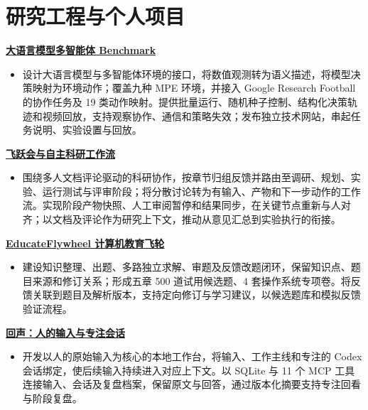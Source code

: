 \documentclass[10pt,a4paper,UTF8,fontset=fandol]{ctexart}
\begin{document}
\section{研究工程与个人项目}
\textbf{\href{https://huangshengzebluesky.github.io/projects/multi-agent-benchmark.html}{大语言模型多智能体 Benchmark}}\par
\begin{itemize}
\item 设计大语言模型与多智能体环境的接口，将数值观测转为语义描述，将模型决策映射为环境动作；覆盖九种 MPE 环境，并接入 Google Research Football 的协作任务及 19 类动作映射。提供批量运行、随机种子控制、结构化决策轨迹和视频回放，支持观察协作、通信和策略失效；发布独立技术网站，串起任务说明、实验设置与回放。
\end{itemize}
\textbf{\href{https://huangshengzebluesky.github.io/projects/flyreview.html}{飞跃会与自主科研工作流}}\par
\begin{itemize}
\item 围绕多人文档评论驱动的科研协作，按章节归组反馈并路由至调研、规划、实验、运行测试与评审阶段；将分散讨论转为有输入、产物和下一步动作的工作流。实现阶段产物快照、人工审阅暂停和结果同步，在关键节点重新与人对齐；以文档及评论作为研究上下文，推动从意见汇总到实验执行的衔接。
\end{itemize}
\textbf{\href{https://huangshengzebluesky.github.io/projects/educate-flywheel.html}{EducateFlywheel 计算机教育飞轮}}\par
\begin{itemize}
\item 建设知识整理、出题、多路独立求解、审题及反馈改题闭环，保留知识点、题目来源和修订关系；形成五章 500 道试用候选题、4 套操作系统专项卷。将反馈关联到题目及解析版本，支持定向修订与学习建议，以候选题库和模拟反馈验证流程。
\end{itemize}
\textbf{\href{https://huangshengzebluesky.github.io/projects/echo.html}{回声：人的输入与专注会话}}\par
\begin{itemize}
\item 开发以人的原始输入为核心的本地工作台，将输入、工作主线和专注的 Codex 会话绑定，使后续输入持续进入对应上下文。以 SQLite 与 11 个 MCP 工具连接输入、会话及复盘档案，保留原文与回答，通过版本化摘要支持专注回看与阶段复盘。
\end{itemize}
\end{document}
